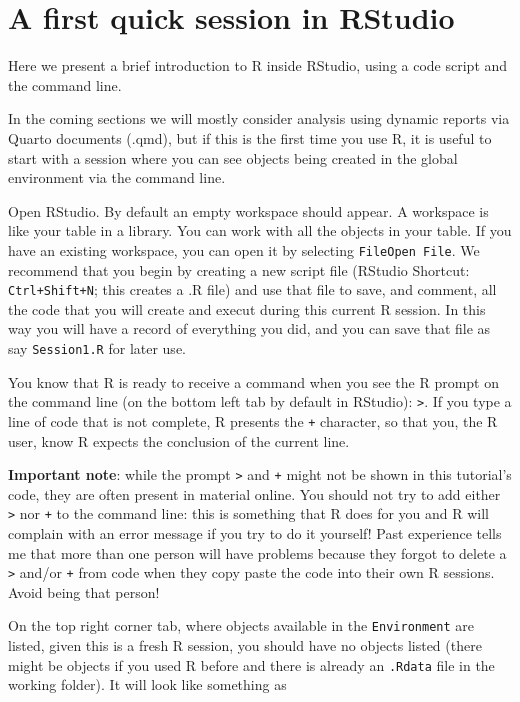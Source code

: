 \documentclass[
  letterpaper,
  DIV=11,
  numbers=noendperiod]{scrartcl}
\begin{document}
\section{A first quick session in
RStudio}\label{a-first-quick-session-in-rstudio}

Here we present a brief introduction to R inside RStudio, using a code
script and the command line.

In the coming sections we will mostly consider analysis using dynamic
reports via Quarto documents (.qmd), but if this is the first time you
use R, it is useful to start with a session where you can see objects
being created in the global environment via the command line.

Open RStudio. By default an empty workspace should appear. A workspace
is like your table in a library. You can work with all the objects in
your table. If you have an existing workspace, you can open it by
selecting \texttt{File\textbar{}Open\ File}. We recommend that you begin
by creating a new script file (RStudio Shortcut: \texttt{Ctrl+Shift+N};
this creates a .R file) and use that file to save, and comment, all the
code that you will create and execut during this current R session. In
this way you will have a record of everything you did, and you can save
that file as say \texttt{Session1.R} for later use.

You know that R is ready to receive a command when you see the R prompt
on the command line (on the bottom left tab by default in RStudio):
\texttt{\textgreater{}}. If you type a line of code that is not
complete, R presents the \texttt{+} character, so that you, the R user,
know R expects the conclusion of the current line.

\textbf{Important note}: while the prompt \texttt{\textgreater{}} and
\texttt{+} might not be shown in this tutorial's code, they are often
present in material online. You should not try to add either
\texttt{\textgreater{}} nor \texttt{+} to the command line: this is
something that R does for you and R will complain with an error message
if you try to do it yourself! Past experience tells me that more than
one person will have problems because they forgot to delete a
\texttt{\textgreater{}} and/or \texttt{+} from code when they copy paste
the code into their own R sessions. Avoid being that person!

On the top right corner tab, where objects available in the
\texttt{Environment} are listed, given this is a fresh R session, you
should have no objects listed (there might be objects if you used R
before and there is already an \texttt{.Rdata} file in the working
folder). It will look like something as
\end{document}
